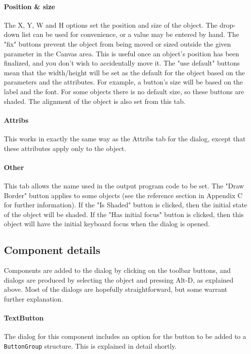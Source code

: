 \paragraph{Position \& size}
The X, Y, W and H options set the position and size of the object. The
drop-down list can be used for convenience, or a value may be entered
by hand. The "fix" buttons prevent the
object from being moved or sized outside the given parameter in the
Canvas area. This is useful once an object's position
has been finalized, and you don't wish to accidentally
move it. The "use default" buttons mean
that the width/height will be set as the default for the object based
on the parameters and the attributes. For example, a
button's size will be based on the label and the font.
For some objects there is no default size, so these buttons are shaded.
The alignment of the object is also set from this tab.

\paragraph{Attribs}
This works in exactly the same way as the Attribs tab for the dialog,
except that these attributes apply only to the object.

\paragraph{Other}
This tab allows the name used in the output program code to be set.
The "Draw
Border" button applies to some objects (see the reference
section in Appendix C for further information). If the
"Is Shaded" button is clicked, then the
initial state of the object will be shaded. If the "Has
initial focus" button is clicked, then this object will
have the initial keyboard focus when the dialog is
opened.

\subsection*{Component details}

Components are added to the dialog by clicking on the toolbar buttons,
and dialogs are produced by selecting the object and pressing Alt-D, as
explained above. Most of the dialogs are hopefully straightforward, but
some warrant further explanation.

\paragraph{TextButton}
The dialog for this component includes an option for the button to be
added to a \texttt{ButtonGroup} structure. This is explained in detail
shortly.

